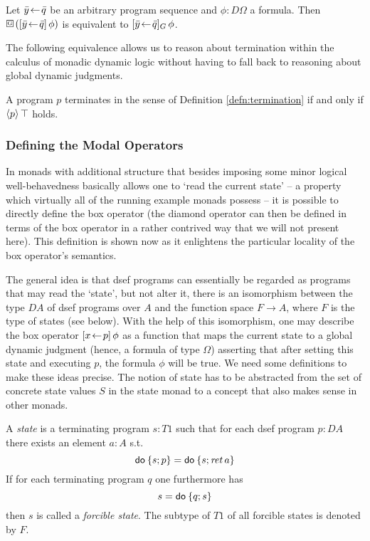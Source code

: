 \begin{prop}
  Let $\bar y\!\gets\! \bar q$ be an arbitrary program sequence and $\phi : D\Omega$ a
  formula. Then $\gbox(\PDLBox{\bar y\leteq\bar q}\phi)$ is equivalent to
  $[\bar y\!\gets\! \bar q]_G\,\phi$.
\end{prop}

The following equivalence allows us to reason about termination within the
calculus of monadic dynamic logic without having to fall back to reasoning about
global dynamic judgments.
\begin{prop}[Termination]
  A program $p$ terminates in the sense of Definition \ref{defn:termination} if
  and only if $\langle p\rangle\,\top$ holds.
\end{prop}


\subsubsection{Defining the Modal Operators}
In monads with additional structure that besides imposing some minor logical
well-behavedness basically allows one to `read the current state' -- a property
which virtually all of the running example monads possess -- it is possible to
directly define the box operator (the diamond operator can then be defined in
terms of the box operator in a rather contrived way that we will not present
here). This definition is shown now as it enlightens the particular locality of
the box operator's semantics.

The general idea is that dsef programs can essentially be regarded as programs
that may read the `state', but not alter it, \IE there is an isomorphism between
the type $D A$ of dsef programs over $A$ and the function space $F \to A$, where
$F$ is the type of states (see below). With the help of this isomorphism, one
may describe the box operator $[x\!\gets\! p]\,\phi$ as a function that maps the
current state to a global dynamic judgment (hence, a formula of type $\Omega$)
asserting that after setting this state and executing $p$, the formula $\phi$ will
be true. We need some definitions to make these ideas precise.
The notion of state has to be abstracted
from the  set of concrete state values $S$ in the state monad to a concept that
also makes sense in other monads.

\begin{defn}
  A \emph{state} is a terminating program $s : T1$ such that for each dsef
  program $p : DA$ there exists an element $a : A$ s.t.
  \[ \mathsf{do}\: \{s; p\} = \mathsf{do}\: \{s; \mathit{ret\,} a\} \]
  If for each terminating program $q$ one furthermore has
  \[ s             = \mathsf{do}\: \{q; s\} \]
  then $s$ is called a \emph{forcible state}. The subtype of $T1$ of all
  forcible states is denoted by $F$.
\end{defn}

